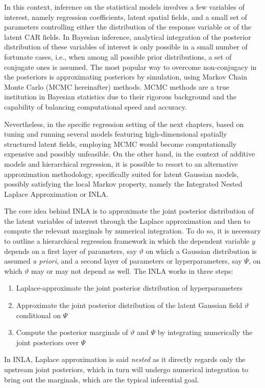\documentclass[openany, 11pt, oneside]{book}
\begin{document}
In this context, inference on the statistical models involves a few variables of interest, namely regression coefficients, latent spatial fields, and a small set of parameters controlling either the distribution of the response variable or of the latent CAR fields. In Bayesian inference, analytical integration of the posterior distribution of these variables of interest is only possible in a small number of fortunate cases, i.e., when among all possible prior distributions, a set of conjugate ones is assumed. The most popular way to overcome non-conjugacy in the posteriors is approximating posteriors by simulation, using Markov Chain Monte Carlo (MCMC hereinafter) methods. MCMC methods are a true institution in Bayesian statistics due to their rigorous background and the capability of balancing computational speed and accuracy.

Nevertheless, in the specific regression setting of the next chapters, based on tuning and running several models featuring high-dimensional spatially structured latent fields, employing MCMC would become computationally expensive and possibly unfeasible. On the other hand, in the context of additive models \parencite{WoodINLA} and hierarchical regression, it is possible to resort to an alternative approximation methodology, specifically suited for latent Gaussian models, possibly satisfying the local Markov property, namely the Integrated Nested Laplace Approximation or INLA.

The core idea behind INLA is to approximate the joint posterior distribution of the latent variables of interest through the Laplace approximation and then to compute the relevant marginals by numerical integration. To do so, it is necessary to outline a hierarchical regression framework in which the dependent variable $y$ depends on a first layer of parameters, say $\vartheta$ on which a Gaussian distribution is assumed \textit{a priori}, and a second layer of parameters or hyperparameters, say $\Psi$, on which $\vartheta$ may or may not depend as well. The INLA works in three steps: \begin{enumerate}
  \item Laplace-approximate the joint posterior distribution of hyperparameters 
  \item Approximate the joint posterior distribution of the latent Gaussian field $\vartheta$ conditional on $\Psi$
  \item Compute the posterior marginals of $\vartheta$ and $\Psi$ by integrating numerically the joint posteriors over $\Psi$
\end{enumerate}
In INLA, Laplace approximation is said \textit{nested} as it directly regards only the upstream joint posteriors, which in turn will undergo numerical integration to bring out the marginals, which are the typical inferential goal. 
\end{document}

